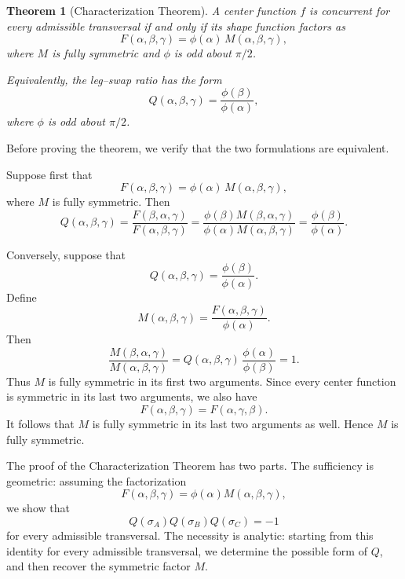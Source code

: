 \documentclass[12pt,a4paper]{amsart}
\newtheorem{theorem}{Theorem} [section]
\theoremstyle{remark}
\begin{document}
\begin{theorem}[Characterization Theorem]
\label{thm:universal}
A center function \(f\) is concurrent for every admissible transversal if and
only if its shape function factors as
\begin{equation}
\label{eq:family}
F(\alpha,\beta,\gamma)
=
\phi(\alpha)\,M(\alpha,\beta,\gamma),
\end{equation}
where \(M\) is fully symmetric and \(\phi\) is odd about \(\pi/2\).

Equivalently, the leg--swap ratio has the form
\begin{equation}
\label{eq:Qcharacterization}
Q(\alpha,\beta,\gamma)
=
\frac{\phi(\beta)}{\phi(\alpha)},
\end{equation}
where \(\phi\) is odd about \(\pi/2\).
\end{theorem}

Before proving the theorem, we verify that the two formulations are equivalent.

Suppose first that
\[
F(\alpha,\beta,\gamma)
=
\phi(\alpha)\,M(\alpha,\beta,\gamma),
\]
where \(M\) is fully symmetric.  Then
\[
Q(\alpha,\beta,\gamma)
=
\frac{F(\beta,\alpha,\gamma)}
     {F(\alpha,\beta,\gamma)}
=
\frac{\phi(\beta)M(\beta,\alpha,\gamma)}
     {\phi(\alpha)M(\alpha,\beta,\gamma)}
=
\frac{\phi(\beta)}{\phi(\alpha)}.
\]

Conversely, suppose that
\[
Q(\alpha,\beta,\gamma)
=
\frac{\phi(\beta)}{\phi(\alpha)}.
\]
Define
\[
M(\alpha,\beta,\gamma)
=
\frac{F(\alpha,\beta,\gamma)}{\phi(\alpha)}.
\]
Then
\[
\frac{M(\beta,\alpha,\gamma)}
     {M(\alpha,\beta,\gamma)}
=
Q(\alpha,\beta,\gamma)\,
\frac{\phi(\alpha)}{\phi(\beta)}
=
1.
\]
Thus \(M\) is fully symmetric in its first two arguments.  Since every center function
is symmetric in its last two arguments, we also have
\[
F(\alpha,\beta,\gamma)=F(\alpha,\gamma,\beta).
\]
It follows that \(M\) is fully symmetric in its last two arguments as well.  Hence
\(M\) is fully symmetric.

The proof of the Characterization Theorem has two parts.  The sufficiency is
geometric: assuming the factorization
\[
F(\alpha,\beta,\gamma)=\phi(\alpha)M(\alpha,\beta,\gamma),
\]
we show that
\[
Q(\sigma_A)Q(\sigma_B)Q(\sigma_C)=-1
\]
for every admissible transversal.  The necessity is analytic: starting from this
identity for every admissible transversal, we determine the possible form of
\(Q\), and then recover the symmetric factor \(M\).
\end{document}
